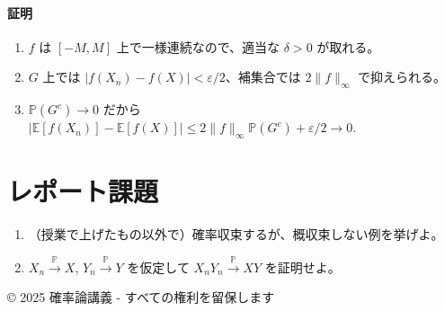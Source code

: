 \documentclass[uplatex,dvipdfmx,11pt,a4paper,openany]{bxjsbook}
\begin{document}
\paragraph{証明}
\begin{enumerate}
\item $f$ は $[-M,M]$ 上で一様連続なので、適当な $\delta>0$ が取れる。
\item $G$ 上では $|f(X_n)-f(X)| < \varepsilon/2$、補集合では $2\|f\|_\infty$ で抑えられる。
\item $\mathbb P(G^c) \to 0$ だから $|\mathbb E[f(X_n)]-\mathbb E[f(X)]| \le 2\|f\|_\infty \mathbb P(G^c) + \varepsilon/2 \to 0$.
\end{enumerate}


\section{レポート課題}
\begin{enumerate}
\item （授業で上げたもの以外で）確率収束するが、概収束しない例を挙げよ。
\item $X_n \xrightarrow{\mathbb P} X$, $Y_n \xrightarrow{\mathbb P} Y$ を仮定して $X_nY_n \xrightarrow{\mathbb P} XY$ を証明せよ。
\end{enumerate}

© 2025 確率論講義 - すべての権利を留保します
\end{document}
